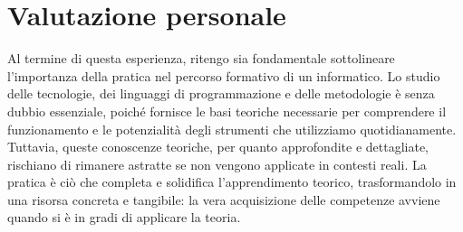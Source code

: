 \section{Valutazione personale}

Al termine di questa esperienza, ritengo sia fondamentale sottolineare l'importanza della pratica nel
percorso formativo di un informatico. Lo studio delle tecnologie, dei linguaggi di programmazione e 
delle metodologie è senza dubbio essenziale, poiché fornisce le basi teoriche necessarie per comprendere 
il funzionamento e le potenzialità degli strumenti che utilizziamo quotidianamente. 
Tuttavia, queste conoscenze teoriche, per quanto approfondite e dettagliate, rischiano di rimanere 
astratte se non vengono applicate in contesti reali. 
La pratica è ciò che completa e solidifica l'apprendimento teorico, trasformandolo in una risorsa concreta e tangibile: la vera acquisizione delle competenze avviene quando si è in gradi di applicare la teoria.

\newpage